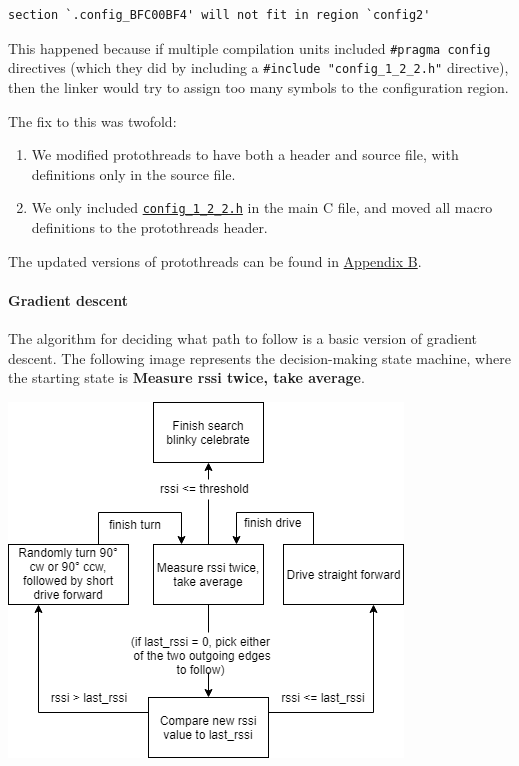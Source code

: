 \documentclass[]{article}
\providecommand{\tightlist}{%
  \setlength{\itemsep}{0pt}\setlength{\parskip}{0pt}}
\let\oldparagraph\paragraph
\renewcommand{\paragraph}[1]{\oldparagraph{#1}\mbox{}}
\begin{document}
\begin{verbatim}
section `.config_BFC00BF4' will not fit in region `config2'
\end{verbatim}

This happened because if multiple compilation units included
\texttt{\#pragma\ config} directives (which they did by including a
\texttt{\#include\ "config\_1\_2\_2.h"} directive), then the linker
would try to assign too many symbols to the configuration region.

The fix to this was twofold:

\begin{enumerate}
\def\labelenumi{\arabic{enumi}.}
\tightlist
\item
  We modified protothreads to have both a header and source file, with
  definitions only in the source file.
\item
  We only included
  \href{generated/config_1_2_2.h.html}{\texttt{config\_1\_2\_2.h}} in
  the main C file, and moved all macro definitions to the protothreads
  header.
\end{enumerate}

The updated versions of protothreads can be found in
\protect\hyperlink{appendix-b-source-listing}{Appendix B}.

\hypertarget{gradient-descent}{%
\paragraph{Gradient descent}\label{gradient-descent}}

The algorithm for deciding what path to follow is a basic version of
gradient descent. The following image represents the decision-making
state machine, where the starting state is \textbf{Measure rssi twice,
take average}.

\includegraphics{grad_desc.png}
\end{document}
